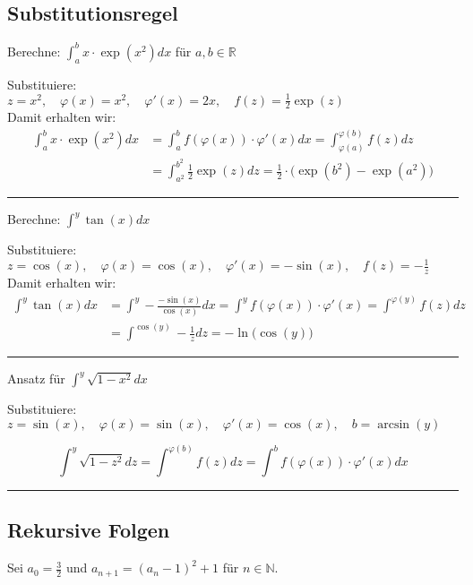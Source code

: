 \documentclass[10pt,a4paper]{article}
\begin{document}
\begin{minipage}{0.5\textwidth}
\subsection*{Substitutionsregel}
Berechne: $\displaystyle \int_a^b x\cdot\exp(x^2)dx$ für $a,b\in\mathbb{R}$

Substituiere:\\
$ \displaystyle
z = x^2, \quad
\varphi(x) = x^2, \quad
\varphi'(x) = 2x, \quad
f(z) = \frac{1}{2}\exp(z)$ \\

Damit erhalten wir:
\begin{align*}
	\int_a^b x\cdot\exp(x^2)dx &= \int_a^b f(\varphi(x))\cdot\varphi'(x)dx = \int_{\varphi(a)}^{\varphi(b)}f(z)dz \\
							   &= \int_{a^2}^{b^2}\frac{1}{2}\exp(z)dz = \frac{1}{2}\cdot\big(\exp(b^2)-\exp(a^2)\big)
\end{align*}

\hrule
\vspace{1em}

Berechne: $\displaystyle \int^y\tan(x)dx$

Substituiere: \\
$ \displaystyle
z = \cos(x), \quad
\varphi(x) = \cos(x), \quad
\varphi'(x) = -\sin(x), \quad
f(z) = -\frac{1}{z}$ \\

Damit erhalten wir:
\begin{align*}
	\int^y\tan(x)dx &= \int^y-\frac{-\sin(x)}{\cos(x)}dx = \int^y f(\varphi(x))\cdot\varphi'(x) = \int^{\varphi(y)}f(z)dz \\
					&= \int^{\cos(y)}-\frac{1}{z}dz = -\ln\big(\cos(y)\big)
\end{align*}

\hrule
\vspace{1em}

Ansatz für $\displaystyle \int^y\sqrt{1-x^2}dx$

Substituiere:\\
$ \displaystyle
z = \sin(x), \quad
\varphi(x) = \sin(x), \quad
\varphi'(x) = \cos(x), \quad
b=\arcsin(y)$

\[\int^y\sqrt{1-z^2}dz=\int^{\varphi(b)}f(z)dz=\int^b f(\varphi(x))\cdot\varphi'(x)dx\]

\hrule
\vspace{1em}

\subsection*{Rekursive Folgen}
Sei $a_0 = \frac{3}{2}$ und $a_{n+1} = (a_n - 1)^2 + 1$ für $n\in\mathbb{N}$.


\end{minipage}
\end{document}
